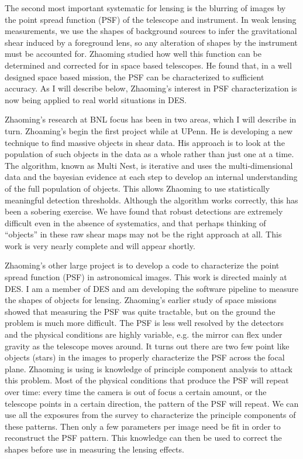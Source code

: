 \documentclass[12pt]{letter}
\begin{document}
\begin{letter}{}
The second most important systematic for lensing is the blurring of images by
the point spread function (PSF) of the telescope and instrument.  In weak
lensing measurements, we use the shapes of background sources to infer the
gravitational shear induced by a foreground lens, so any alteration of shapes
by the instrument must be accounted for.  Zhaoming studied how well this
function can be determined and corrected for in space based telescopes.  He
found that, in a well designed space based mission, the PSF can be
characterized to sufficient accuracy.  As I will describe below, Zhaoming's
interest in PSF characterization is now being applied to real world situations
in DES.


Zhaoming's research at BNL focus has been in two areas, which I will describe
in turn.  Zhoaming's begin the first project while at UPenn. He is developing a
new technique to find massive objects in shear data.  His approach is to look
at the population of such objects in the data as a whole rather than just one
at a time.  The algorithm, known as Multi Nest, is iterative and uses the
multi-dimensional data and the bayesian evidence at each step to develop an
internal understanding of the full population of objects. This allows Zhaoming
to use statistically meaningful detection thresholds.  Although the algorithm
works correctly, this has been a sobering exercise. We have found that robust
detections are extremely difficult even in the absence of systematics, and that
perhaps thinking of ``objects'' in these raw shear maps may not be the right
approach at all.  This work is very nearly complete and will appear shortly.

Zhaoming's other large project is to develop a code to characterize the point
spread function (PSF) in astronomical images.  This work is directed mainly at
DES.  I am a member of DES and am developing the software pipeline to measure
the shapes of objects for lensing.  Zhaoming's earlier study of space missions
showed that measuring the PSF was quite tractable, but on the ground the
problem is much more difficult.  The PSF is less well resolved by the detectors
and the physical conditions are highly variable, e.g. the mirror can flex under
gravity as the telescope moves around.  It turns out there are two few point
like objects (stars) in the images to properly characterize the PSF across the
focal plane.  Zhaoming is using is knowledge of principle component analysis to
attack this problem.  Most of the physical conditions that produce the PSF will
repeat over time: every time the camera is out of focus a certain amount, or
the telescope points in a certain direction, the pattern of the PSF will
repeat. We can use all the exposures from the survey to characterize the
principle components of these patterns.  Then only a few parameters per image
need be fit in order to reconstruct the PSF pattern.  This knowledge can then
be used to correct the shapes before use in measuring the lensing effects.


\end{letter}
\end{document}
